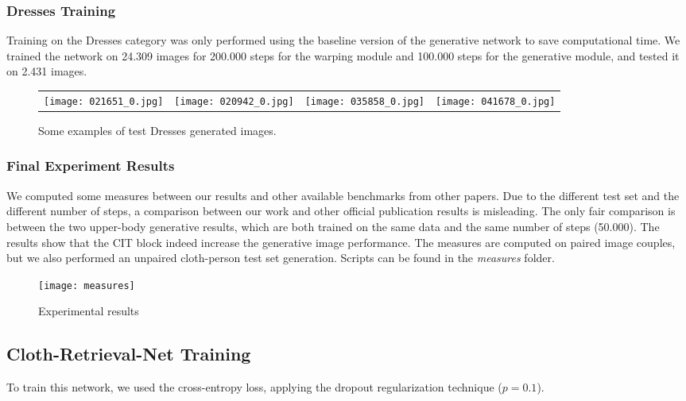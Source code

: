 \subsubsection{Dresses Training}

Training on the Dresses category was only performed using the baseline version of the generative network to save computational time. We trained the network on 24.309 images for 200.000 steps for the warping module and 100.000 steps for the generative module, and tested it on 2.431 images.


\begin{figure}[h]
\centering
\begin{tabular}{cccc}
{\texttt{[image: 021651\_0.jpg]}} &
{\texttt{[image: 020942\_0.jpg]}} &
{\texttt{[image: 035858\_0.jpg]}} &
{\texttt{[image: 041678\_0.jpg]}} \\
\end{tabular}

\caption{Some examples of test Dresses generated images.}
\end{figure}



\subsubsection{Final Experiment Results}
We computed some measures between our results and other available benchmarks from other papers. Due to the different test set and the different number of steps, a comparison between our work and other official publication results is misleading. The only fair comparison is between the two upper-body generative results, which are both trained on the same data and the same number of steps (50.000). The results show that the CIT block indeed increase the generative image performance. The measures are computed on paired image couples, but we also performed an unpaired cloth-person test set generation. Scripts can be found in the \textit{measures} folder.

\begin{figure}[h]
\centering
\texttt{[image: measures]}
\caption{Experimental results}
\label{fig:Measures}
\end{figure}


\subsection{Cloth-Retrieval-Net Training}
\label{retrieval-training}

To train this network, we used the cross-entropy loss, applying the dropout regularization technique ($p=0.1$).


